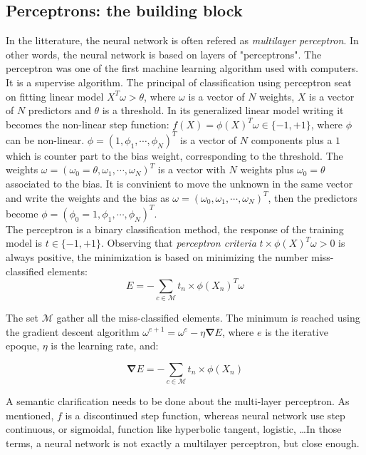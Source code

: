 \documentclass[final, paper=letter,5p,times,twocolumn]{elsarticle}
\begin{document}
\subsection{Perceptrons: the building block}
In the litterature, the neural network is often refered as {\it multilayer perceptron}. In other words, the neural network is based on layers of "perceptrons". The perceptron was one of the first machine learning algorithm used with computers. It is a supervise algorithm. The principal of classification using perceptron seat on fitting linear model $X^{T}\omega > \theta$, where $\omega$ is a vector of $N$ weights, $X$ is a vector of $N$ predictors and $\theta$ is a threshold. In its generalized linear model writing it becomes the non-linear step function: $f(X) = \phi(X)^{T}\omega \in \{-1,+1\}$, where $\phi$ can be non-linear. $\phi = (1, \phi_{1}, \cdots, \phi_{N})^{T}$ is a vector of $N$ components plus a $1$ which is counter part to the bias weight, corresponding to the threshold. The weights $\omega = (\omega_{0} = \theta, \omega_{1}, \cdots, \omega_{N})^{T}$ is a vector with $N$ weights plus $\omega_{0} = \theta$ associated to the bias. It is convinient to move the unknown in the same vector and write the weights and the bias as $\omega = (\omega_{0}, \omega_{1}, \cdots, \omega_{N})^{T}$, then the predictors become $\phi = (\phi_{0} = 1, \phi_{1}, \cdots, \phi_{N})^{T}$. \\
The perceptron is a binary classification method, the response of the training model is $t \in \{-1,+1\}$. Observing that {\it perceptron criteria} $t \times \phi(X)^{T}\omega > 0$ is always positive, the minimization is based on minimizing the number miss-classified elements: \\

\begin{equation}
E = - \sum_{c \in \mathcal{M}} t_{n} \times \phi(X_{n})^{T}\omega
\label{eq:Optimization_perceptron}
\end{equation}

The set $\mathcal{M}$ gather all the miss-classified elements. The minimum is reached using the gradient descent algorithm $\omega^{e+1} = \omega^{e} - \eta \bm{\nabla} E$, where $e$ is the iterative epoque, $\eta$ is the learning rate, and:

$$
\bm{\nabla} E = - \sum_{c \in \mathcal{M}} t_{n} \times \phi(X_{n})
$$

A semantic clarification needs to be done about the multi-layer perceptron. As mentioned, $f$ is a discontinued step function, whereas neural network use step continuous, or sigmoidal, function like hyperbolic tangent, logistic, \dots In those terms, a neural network is not exactly a multilayer perceptron, but close enough.
\end{document}
